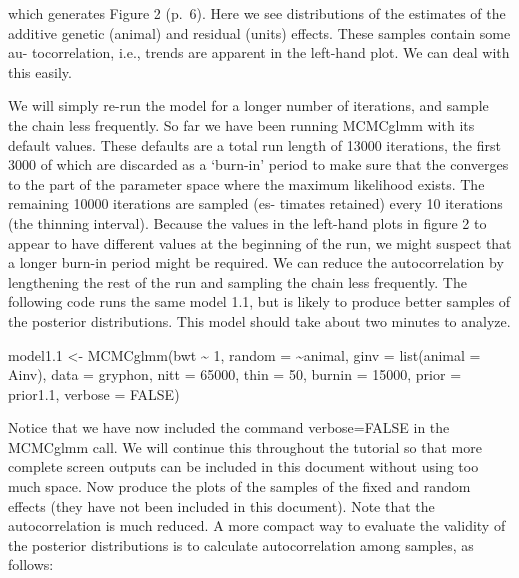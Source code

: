 \documentclass[
  12pt,
]{book}
\newenvironment{Shaded}{\begin{snugshade}}{\end{snugshade}}
\newcommand{\AttributeTok}[1]{\textcolor[rgb]{0.77,0.63,0.00}{#1}}
\newcommand{\ConstantTok}[1]{\textcolor[rgb]{0.00,0.00,0.00}{#1}}
\newcommand{\DecValTok}[1]{\textcolor[rgb]{0.00,0.00,0.81}{#1}}
\newcommand{\FloatTok}[1]{\textcolor[rgb]{0.00,0.00,0.81}{#1}}
\newcommand{\FunctionTok}[1]{\textcolor[rgb]{0.00,0.00,0.00}{#1}}
\newcommand{\NormalTok}[1]{#1}
\newcommand{\OtherTok}[1]{\textcolor[rgb]{0.56,0.35,0.01}{#1}}
\newcommand{\SpecialCharTok}[1]{\textcolor[rgb]{0.00,0.00,0.00}{#1}}
\begin{document}
which generates Figure 2 (p.~6). Here we see distributions of the estimates of the additive genetic (animal) and residual (units) effects. These samples contain some au- tocorrelation, i.e., trends are apparent in the left-hand plot. We can deal with this easily.

We will simply re-run the model for a longer number of iterations, and sample the chain less frequently. So far we have been running MCMCglmm with its default values. These defaults are a total run length of 13000 iterations, the first 3000 of which are discarded as a `burn-in' period to make sure that the converges to the part of the parameter space where the maximum likelihood exists. The remaining 10000 iterations are sampled (es- timates retained) every 10 iterations (the thinning interval). Because the values in the left-hand plots in figure 2 to appear to have different values at the beginning of the run, we might suspect that a longer burn-in period might be required. We can reduce the autocorrelation by lengthening the rest of the run and sampling the chain less frequently. The following code runs the same model 1.1, but is likely to produce better samples of the posterior distributions. This model should take about two minutes to analyze.

\begin{Shaded}
\begin{Highlighting}[]
\NormalTok{model1}\FloatTok{.1} \OtherTok{\textless{}{-}} \FunctionTok{MCMCglmm}\NormalTok{(bwt }\SpecialCharTok{\textasciitilde{}} \DecValTok{1}\NormalTok{, }\AttributeTok{random =} \SpecialCharTok{\textasciitilde{}}\NormalTok{animal, }\AttributeTok{ginv =} \FunctionTok{list}\NormalTok{(}\AttributeTok{animal =}\NormalTok{ Ainv), }\AttributeTok{data =}\NormalTok{ gryphon, }\AttributeTok{nitt =} \DecValTok{65000}\NormalTok{, }\AttributeTok{thin =} \DecValTok{50}\NormalTok{, }\AttributeTok{burnin =} \DecValTok{15000}\NormalTok{, }\AttributeTok{prior =}\NormalTok{ prior1}\FloatTok{.1}\NormalTok{, }\AttributeTok{verbose =} \ConstantTok{FALSE}\NormalTok{)}
\end{Highlighting}
\end{Shaded}

Notice that we have now included the command verbose=FALSE in the MCMCglmm call. We will continue this throughout the tutorial so that more complete screen outputs can be included in this document without using too much space. Now produce the plots of the samples of the fixed and random effects (they have not been included in this document). Note that the autocorrelation is much reduced. A more compact way to evaluate the validity of the posterior distributions is to calculate autocorrelation among samples, as follows:
\end{document}

